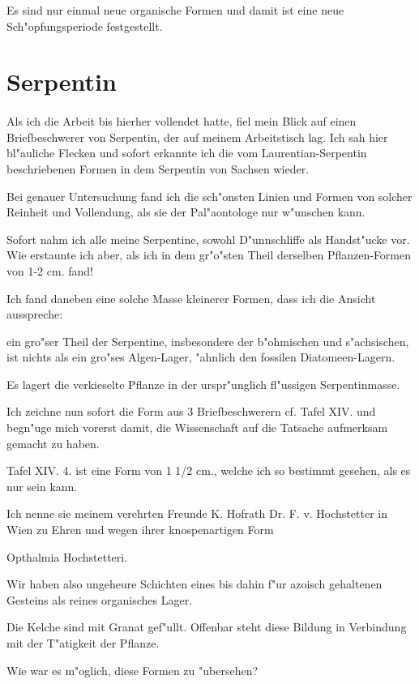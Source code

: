 \documentclass[a4paper, 11pt, oneside, german]{article}
\begin{document}
Es sind nur einmal neue organische Formen und damit ist eine neue Sch"opfungsperiode festgestellt.
\clearpage
\section{Serpentin}
\paragraph{}
Als ich die Arbeit bis hierher vollendet hatte, fiel mein Blick auf einen Briefbeschwerer von Serpentin, der auf meinem Arbeitstisch lag. Ich sah hier bl"auliche Flecken und sofort erkannte ich die vom Laurentian-Serpentin beschriebenen Formen in dem Serpentin von Sachsen wieder.

Bei genauer Untersuchung fand ich die sch"onsten Linien und Formen von solcher Reinheit und Vollendung, als sie der Pal"aontologe nur w"unschen kann.

Sofort nahm ich alle meine Serpentine, sowohl D"unnschliffe als Handst"ucke vor. Wie erstaunte ich aber, als ich in dem gr"o"sten Theil derselben Pflanzen-Formen von 1-2 cm. fand!

Ich fand daneben eine solche Masse kleinerer Formen, dass ich die Ansicht ausspreche:

ein gro"ser Theil der Serpentine, insbesondere der b"ohmischen und s"achsischen, ist nichts als ein gro"ses Algen-Lager, "ahnlich den fossilen Diatomeen-Lagern.

Es lagert die verkieselte Pflanze in der urspr"unglich fl"ussigen Serpentinmasse.

Ich zeichne nun sofort die Form aus 3 Briefbeschwerern cf. Tafel XIV. und begn"uge mich vorerst damit, die Wissenschaft auf die Tatsache aufmerksam gemacht zu haben.

Tafel XIV. 4. ist eine Form von 1 1/2 cm., welche ich so bestimmt gesehen, als es nur sein kann.

Ich nenne sie meinem verehrten Freunde K. Hofrath Dr. F. v. Hochstetter in Wien zu Ehren und wegen ihrer knospenartigen Form

Opthalmia Hochstetteri.

Wir haben also ungeheure Schichten eines bis dahin f"ur azoisch gehaltenen Gesteins als reines organisches Lager.

Die Kelche sind mit Granat gef"ullt. Offenbar steht diese Bildung in Verbindung mit der T"atigkeit der Pflanze.

Wie war es m"oglich, diese Formen zu "ubersehen?
\end{document}
